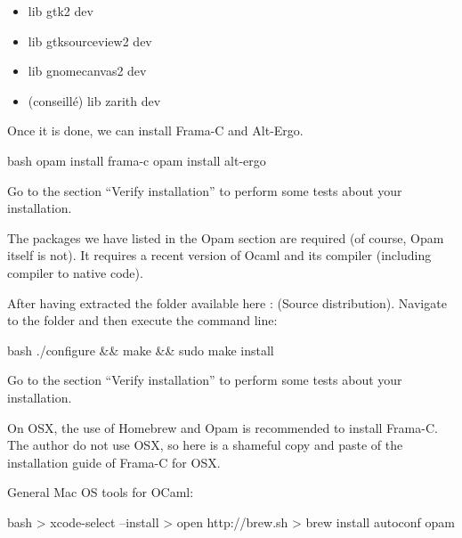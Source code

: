 \begin{itemize}
\item lib gtk2 dev
\item lib gtksourceview2 dev
\item lib gnomecanvas2 dev
\item (conseillé) lib zarith dev
\end{itemize}



Once it is done, we can install Frama-C and Alt-Ergo.




\begin{CodeBlock}{bash}
opam install frama-c
opam install alt-ergo
\end{CodeBlock}



Go to the section ``Verify installation'' to perform some tests about
your installation.





The packages we have listed in the Opam section are required (of course,
Opam itself is not). It requires a recent version of Ocaml and its
compiler (including compiler to native code).



After having extracted the folder available here :
 (Source distribution).
Navigate to the folder and then execute the command line:



\begin{CodeBlock}{bash}
./configure && make && sudo make install
\end{CodeBlock}



Go to the section ``Verify installation'' to perform some tests about
your installation.





On OSX, the use of Homebrew and Opam is recommended to install Frama-C.
The author do not use OSX, so here is a shameful copy and paste of the
installation guide of Frama-C for OSX.




General Mac OS tools for OCaml:



\begin{CodeBlock}{bash}
> xcode-select --install 
> open http://brew.sh
> brew install autoconf opam 
\end{CodeBlock}



